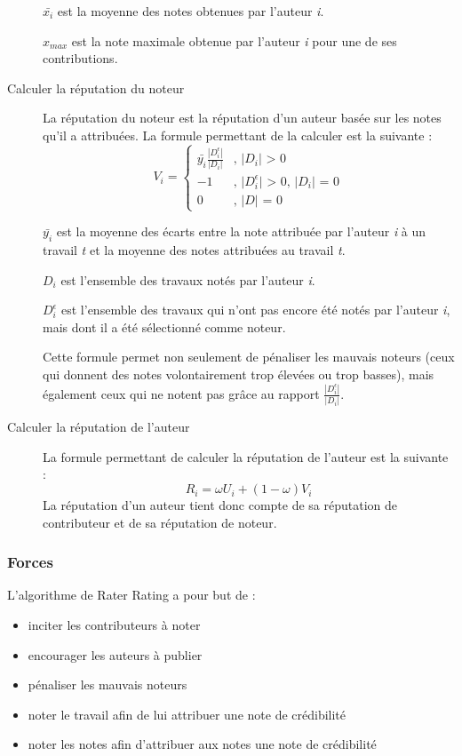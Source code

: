 \documentclass[a4paper, 11pt]{article} %
\begin{document}
\begin{description}
$\bar{x_{i}}$ est la moyenne des notes obtenues par l'auteur \textit{i}.

$x_{max}$ est la note maximale obtenue par l'auteur \textit{i} pour une de ses contributions.

	\item[Calculer la réputation du noteur] La réputation du noteur est la réputation d'un auteur basée sur les notes qu'il a attribuées. La formule permettant de la calculer est la suivante :
$$
V_{i} = \left\{
	\begin{array}{ll}
		\bar{y_{i}} \frac{|D_{i}^{\epsilon}|}{|D_{i}|} & \mbox{, |$D_{i}$| > 0}\\
		-1 & \mbox{, |$D_{i}^{\epsilon}$| > 0, |$D_{i}$| = 0}\\
		0 & \mbox{, |$D$| = 0}
	\end{array}
\right.
$$

$\bar{y_{i}}$ est la moyenne des écarts entre la note attribuée par l'auteur \textit{i} à un travail \textit{t} et la moyenne des notes attribuées au travail \textit{t}.

$D_{i}$ est l'ensemble des travaux notés par l'auteur \textit{i}.

$D_{i}^{\epsilon}$ est l'ensemble des travaux qui n'ont pas encore été notés par l'auteur \textit{i}, mais dont il a été sélectionné comme noteur.

Cette formule permet non seulement de pénaliser les mauvais noteurs (ceux qui donnent des notes volontairement trop élevées ou trop basses), mais également ceux qui ne notent pas grâce au rapport $\frac{|D_{i}^{\epsilon}|}{|D_{i}|}$.

	\item[Calculer la réputation de l'auteur] La formule permettant de calculer la réputation de l'auteur est la suivante :
$$
R_{i} = \omega U_{i} + (1-\omega) V_{i}
$$
La réputation d'un auteur tient donc compte de sa réputation de contributeur et de sa réputation de noteur.
\end{description}

\subsubsection{Forces}
L'algorithme de Rater Rating a pour but de :
\begin{itemize}
	\item inciter les contributeurs à noter
	\item encourager les auteurs à publier
	\item pénaliser les mauvais noteurs
	\item noter le travail afin de lui attribuer une note de crédibilité
	\item noter les notes afin d'attribuer aux notes une note de crédibilité~\cite{RaterRating}
\end{itemize}
\end{document}
